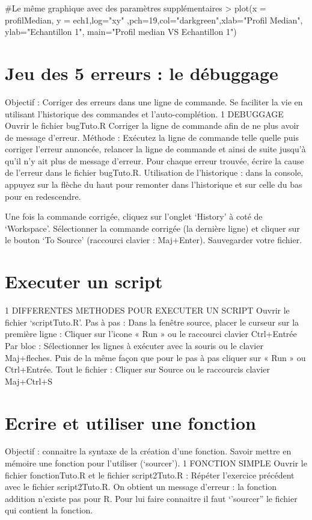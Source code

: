 \documentclass[a4paper]{article}
\begin{document}
\#Le même graphique avec des paramètres supplémentaires 
> plot(x = profilMedian, y = ech1,log="xy" ,pch=19,col="darkgreen",xlab="Profil Median", ylab="Echantillon 1", main="Profil median VS Echantillon 1")

\section{Jeu des 5 erreurs : le débuggage}
Objectif : Corriger des erreurs dans une ligne de commande. Se faciliter la vie en utilisant l'historique des commandes et l'auto-complétion.
1	DEBUGGAGE
Ouvrir le fichier bugTuto.R
Corriger la ligne de commande afin de ne plus avoir de message d'erreur.
Méthode : Exécutez la ligne de commande telle quelle  puis corriger l'erreur annoncée, relancer la ligne de commande et ainsi de suite jusqu'à qu'il n'y ait plus de message d'erreur. Pour chaque erreur trouvée, écrire la cause de l'erreur dans le fichier bugTuto.R.
Utilisation de l'historique : dans la console, appuyez sur la flèche du haut pour remonter dans l'historique et sur celle du bas pour en redescendre.

Une fois la commande corrigée, cliquez sur l'onglet ‘History' à coté de ‘Workspace'. Sélectionner la commande corrigée (la dernière ligne) et cliquer sur le bouton ‘To Source' (raccourci clavier : Maj+Enter).
Sauvegarder votre fichier.
\section{Executer un script}
1	DIFFERENTES METHODES POUR EXECUTER UN SCRIPT 
Ouvrir le fichier ‘scriptTuto.R'.
Pas à pas :
Dans la fenêtre source, placer le curseur sur la première ligne :
Cliquer sur l'icone « Run » ou le raccourci clavier Ctrl+Entrée
Par bloc :
	Sélectionner les lignes à exécuter avec la souris ou le clavier Maj+fleches.
	Puis de la même façon que pour le pas à pas cliquer sur « Run » ou Ctrl+Entrée.
Tout le fichier :
	Cliquer sur Source ou le raccourcis clavier Maj+Ctrl+S


\section{Ecrire et utiliser une fonction}
Objectif : connaitre la syntaxe de la création d'une fonction. Savoir mettre en mémoire une fonction pour l'utiliser (‘sourcer').
1	FONCTION SIMPLE 
Ouvrir le fichier fonctionTuto.R et le fichier script2Tuto.R :
Répéter l'exercice précédent avec le fichier script2Tuto.R.
On obtient un message d'erreur :  la fonction addition n'existe pas pour R. Pour lui faire connaitre il faut ‘'sourcer'' le fichier qui contient la fonction.
\end{document}
